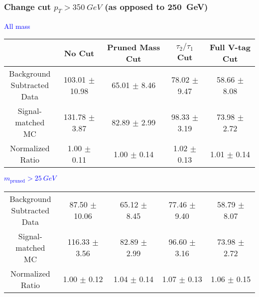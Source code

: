 \documentclass{beamer}
\newcommand{\backupend}{
  \addtocounter{framenumbervorappendix}{-\value{framenumber}}
  \addtocounter{framenumber}{\value{framenumbervorappendix}} 
}
\begin{document}
\begin{frame}
  \frametitle{Change cut $p_T > \SI{350}{GeV}$ (as opposed to \SI{250}{GeV})}
  \begin{adjustwidth}{-1.5em}{-1.5em}
    \centering
    \vspace{6pt}
    \textcolor{blue}{All mass}
    \vspace{6pt}

    {\scriptsize
      \begin{tabular}{c | c | c | c | c}
        \hline
        & No Cut & Pruned Mass Cut & $\tau_2/\tau_1$ Cut & Full V-tag Cut \\
        \hline
        \makecell{Background \\ Subtracted \\ Data} & 103.01 $\pm$ 10.98 & 65.01 $\pm$ 8.46 & 78.02 $\pm$ 9.47 & 58.66 $\pm$ 8.08 \\
        \makecell{Signal-\\ matched MC} & 131.78 $\pm$ 3.87 & 82.89 $\pm$ 2.99 & 98.33 $\pm$ 3.19 & 73.98 $\pm$ 2.72 \\
        \hline
        \makecell{Normalized \\ Ratio} & 1.00 $\pm$ 0.11 & 1.00 $\pm$ 0.14 & 1.02 $\pm$ 0.13 & 1.01 $\pm$ 0.14 \\
        \hline
      \end{tabular}
    }

    \vspace{6pt}
    \textcolor{blue}{$m_\text{pruned} > \SI{25}{GeV}$}
    \vspace{6pt}

    {\scriptsize
      \begin{tabular}{c | c | c | c | c}
        \hline
        \makecell{Background \\ Subtracted \\ Data} & 87.50 $\pm$ 10.06 & 65.12 $\pm$ 8.45 & 77.46 $\pm$ 9.40 & 58.79 $\pm$ 8.07 \\
        \makecell{Signal-\\ matched MC} & 116.33 $\pm$ 3.56 & 82.89 $\pm$ 2.99 & 96.60 $\pm$ 3.16 & 73.98 $\pm$ 2.72 \\
        \hline
        \makecell{Normalized \\ Ratio} & 1.00 $\pm$ 0.12 & 1.04 $\pm$ 0.14 & 1.07 $\pm$ 0.13 & 1.06 $\pm$ 0.15 \\
        \hline
      \end{tabular}
    }
  \end{adjustwidth}
\end{frame}



\backupend
\end{document}
